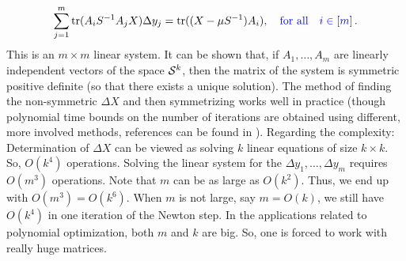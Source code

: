\[
	\sum_{j=1}^m \operatorname{tr}(A_i S^{-1} A_j X) \Delta{y}_j = \operatorname{tr}((X - \mu S^{-1}) A_i)\textcolor{blue}{, \quad\textrm{for all}\quad i \in [m] \,.}
\]
%
This is an $m \times m$ linear system. It can be shown that, if $A_1,\ldots,A_m$ are linearly independent vectors of the space $\mathcal{S}^k$, then the matrix of the system is symmetric positive definite (so that there exists a unique solution). The method of finding the non-symmetric $\Delta X$ and then symmetrizing works well in practice (though polynomial time bounds on the number of iterations are obtained using different, more involved methods, references can be found in \cite{Gaertner:Matousek:2012}). Regarding the complexity: Determination of $\Delta{X}$ can be viewed as solving $k$ linear equations of size $k \times k$. So, $O(k^4)$ operations. Solving the linear system for the $\Delta{y}_1,\ldots,\Delta{y}_m$ requires $O(m^3)$ operations. Note that $m$ can be as large as $O(k^2)$. Thus, we end up with $O(m^3) = O(k^6)$. When $m$ is not large, say $m=O(k)$, we still have $O(k^4)$ in one iteration of the Newton step. In the applications related to polynomial optimization, both $m$ and $k$ are big. So, one is forced to work with really huge matrices.